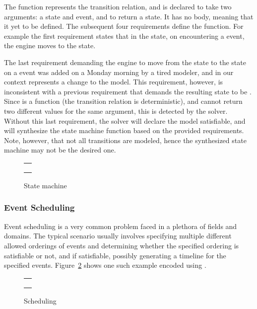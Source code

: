 The function  represents the transition relation, and is
declared to take two arguments: a state and event, and to return a
state.  It has no body, meaning that it yet to be defined. The
subsequent four requirements define the  function. For
example the first requirement states that in the  state, on
encountering a  event, the engine moves to the
 state.

The last requirement demanding the engine to move from the
 state to the  state on a  event was
added on a Monday morning by a tired modeler, and in our context
represents a change to the model.  This requirement, however, is
inconsistent with a previous requirement that demands the resulting
state to be .  Since  is a function (the
transition relation is deterministic), and cannot return two different
values for the same argument, this is detected by the solver.  Without
this last requirement, the solver will declare the model satisfiable,
and will synthesize the state machine function based on the provided
requirements.  Note, however, that not all transitions are modeled,
hence the synthesized state machine may not be the desired one.

\begin{figure}
\centering
\begin{tabular}{c}
\hline \\
 \\ \\
\hline
\end{tabular}
\caption{State machine}
\label{fig:statemachine}
\end{figure}

\subsubsection{Event Scheduling}

Event scheduling is a very common problem faced in a plethora of
fields and domains. The typical scenario usually involves specifying
multiple different allowed orderings of events and determining whether
the specified ordering is satisfiable or not, and if satisfiable,
possibly generating a timeline for the specified events.
Figure~\ref{fig:scheduling} shows one such example encoded using
\Klang{}.

\begin{figure}
\centering
\begin{tabular}{c}
\hline \\
 \\ \\
\hline
\end{tabular}
\caption{Scheduling}
\label{fig:scheduling}
\end{figure}

